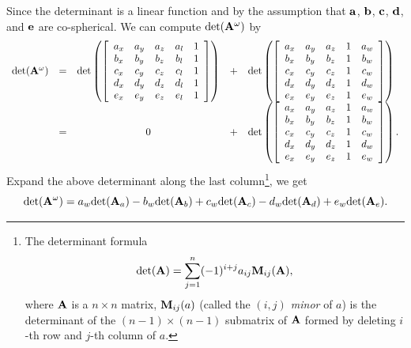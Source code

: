 Since the determinant is a linear function and by the assumption that ${\bf a}$, ${\bf b}$, ${\bf c}$, ${\bf d}$, and ${\bf e}$ are co-spherical. We can compute $\textrm{det}({\bf A}^{\omega})$ by
\[
  \begin{array}{rcccl}
  \textrm{det}({\bf A}^{\omega}) 
   &=& \textrm{det}\left(
      \left[\begin{array}{ccccc}
      a_x & a_y & a_z & a_l & 1\\
      b_x & b_y & b_z & b_l & 1\\
      c_x & c_y & c_z & c_l & 1\\
      d_x & d_y & d_z & d_l & 1\\
      e_x & e_y & e_z & e_l & 1 
      \end{array}\right]\right) &+& 
      \textrm{det}\left(
      \left[\begin{array}{ccccc}
      a_x & a_y & a_z & 1 & a_w\\
      b_x & b_y & b_z & 1 & b_w\\
      c_x & c_y & c_z & 1 & c_w\\
      d_x & d_y & d_z & 1 & d_w\\
      e_x & e_y & e_z & 1 & e_w
      \end{array}\right]\right)\\
    &=& 0 &+& \textrm{det}\left(
      \left[\begin{array}{ccccc}
      a_x & a_y & a_z & 1 & a_w\\
      b_x & b_y & b_z & 1 & b_w\\
      c_x & c_y & c_z & 1 & c_w\\
      d_x & d_y & d_z & 1 & d_w\\
      e_x & e_y & e_z & 1 & e_w
      \end{array}\right]\right).\\
  \end{array}
\]
Expand the above determinant along the last column\footnote{The determinant formula
\[
  \textrm{det}({\bf A}) = \sum_{j=1}^{n} (-1)^{i+j} a_{ij} {\bf M}_{ij}({\bf A}),
\]
where ${\bf A}$ is a $n \times n$ matrix, ${\bf M}_{ij}(a)$ (called the {\it $(i,j)$ minor} of $a$) is the determinant of the $(n-1) \times (n-1)$ submatrix of ${\bf A}$ formed by deleting $i$-th row and $j$-th column of $a$.}, we get
\begin{equation}\label{equ:perturb}
  \textrm{det}({\bf A}^{\omega}) = a_w \textrm{det}({\bf A}_a) - b_w \textrm{det}({\bf A}_b) + c_w \textrm{det}({\bf A}_c) - d_w \textrm{det}({\bf A}_d) + e_w \textrm{det}({\bf A}_e).
\end{equation}
